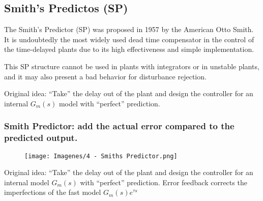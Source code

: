 \subsection{Smith's Predictos (SP)}
The Smith's Predictor (SP) was proposed in 1957 by the American Otto Smith. It is undoubtedly the most widely used dead time compensator in the control of the time-delayed plants due to its high effectiveness and simple implementation.

This SP structure cannot be used in plants with integrators or in unstable plants, and it may also present a bad behavior for disturbance rejection.

Original idea: ``Take'' the delay out of the plant and design the controller for an internal $G_m(s)$ model with ``perfect'' prediction.

\subsubsection{Smith Predictor: add the actual error compared to the predicted output.}

\begin{figure}[H]
    \centering
    \texttt{[image: Imagenes/4 - Smiths Predictor.png]}
\end{figure}

Original idea: ``Take'' the delay out of the plant and design the controller for an internal model $G_m(s)$ with ``perfect'' prediction. Error feedback corrects the imperfections of the fast model $G_m(s) e ^{\tau s}$